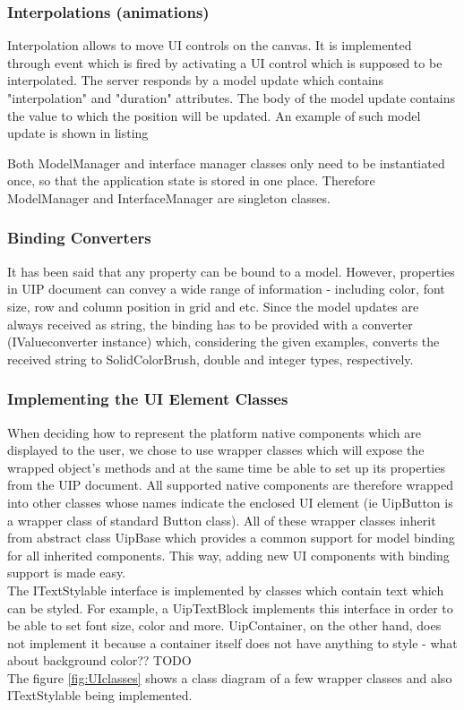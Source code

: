 \subsubsection{Interpolations (animations)}
Interpolation allows to move UI controls on the canvas. It is implemented through event which is fired by activating a UI control which is supposed to be interpolated. The server responds by a model update which contains "interpolation" and "duration" attributes. The body of the model update contains the value to which the position will be updated. An example of such model  update is shown in listing 



Both ModelManager and interface manager classes only need to be instantiated once, so that the application state is stored in one place. Therefore ModelManager and InterfaceManager are singleton classes.

\subsubsection{Binding Converters}
It has been said that any property can be bound to a model. However, properties in UIP document can convey a wide range of information - including color, font size, row and column position in grid and etc. Since the model updates are always received as string, the binding has to be provided with a converter (IValueconverter instance) which, considering the given examples, converts the received string to SolidColorBrush, double and integer types, respectively.

\subsubsection{Implementing the UI Element Classes}
When deciding how to represent the platform native components which are displayed to the user, we chose to use wrapper classes which will expose the wrapped object's methods and at the same time be able to set up its properties from the UIP document. All supported native components are therefore wrapped into other classes whose names indicate the enclosed UI element (ie UipButton is a wrapper class of standard Button class). All of these wrapper classes inherit from abstract class UipBase which provides a common support for model binding for all inherited components. This way, adding new UI components with binding support is made easy.
\\The ITextStylable interface is implemented by classes which contain text which can be styled. For example, a UipTextBlock implements this interface in order to be able to set font size, color and more. UipContainer, on the other hand, does not implement it because a container itself does not have anything to style - what about background color?? TODO\\
The figure \ref{fig:UIclasses} shows a class diagram of a few wrapper classes and also ITextStylable being implemented.

